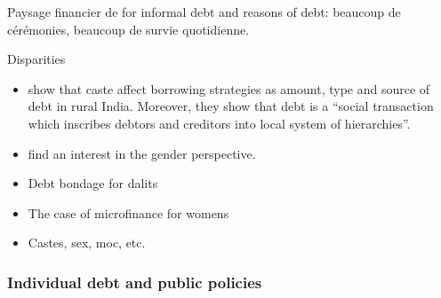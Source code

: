 \documentclass[a4paper, 11pt, onecolumn]{article}
\begin{document}
Paysage financier de \cite{Guerin2012a} for informal debt and reasons of debt: beaucoup de cérémonies, beaucoup de survie quotidienne.


Disparities 
\begin{itemize}
\item \cite{Guerin2013a} show that caste affect borrowing strategies as amount, type and source of debt in rural India.
Moreover, they show that debt is a ``social transaction which inscribes debtors and creditors into local system of hierarchies''.
\item \cite{Reboul2021} find an interest in the gender perspective.
\item Debt bondage for dalits \citep{Guerin2020a}
\item The case of microfinance for womens \citep{Guerin2020b}
\item  Castes, sex, moc, etc.  \citep{Guerin2012a} \citep{Guerin2013a} \citep{Guerin2014} \citep{Reboul2021}
\end{itemize}



		\subsubsection{Individual debt and public policies}
\end{document}

